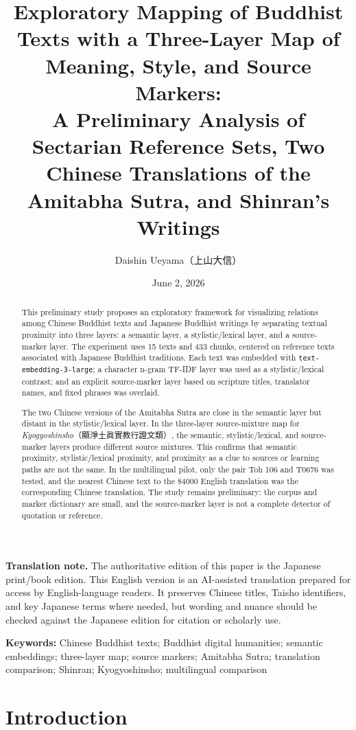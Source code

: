 \documentclass[uplatex,dvipdfmx,11pt,a4paper]{jsarticle}
\title{Exploratory Mapping of Buddhist Texts with a Three-Layer Map of Meaning, Style, and Source Markers:\\[0.35em]A Preliminary Analysis of Sectarian Reference Sets, Two Chinese Translations of the Amitabha Sutra, and Shinran's Writings}
\author{Daishin Ueyama（上山大信）}
\date{June 2, 2026}
\begin{document}
\maketitle

\noindent\textbf{Translation note.}
The authoritative edition of this paper is the Japanese print/book edition. This English version is an AI-assisted translation prepared for access by English-language readers. It preserves Chinese titles, Taisho identifiers, and key Japanese terms where needed, but wording and nuance should be checked against the Japanese edition for citation or scholarly use.

\begin{abstract}
This preliminary study proposes an exploratory framework for visualizing relations among Chinese Buddhist texts and Japanese Buddhist writings by separating textual proximity into three layers: a semantic layer, a stylistic/lexical layer, and a source-marker layer. The experiment uses 15 texts and 433 chunks, centered on reference texts associated with Japanese Buddhist traditions. Each text was embedded with \texttt{text-embedding-3-large}; a character n-gram TF-IDF layer was used as a stylistic/lexical contrast; and an explicit source-marker layer based on scripture titles, translator names, and fixed phrases was overlaid.

The two Chinese versions of the Amitabha Sutra are close in the semantic layer but distant in the stylistic/lexical layer. In the three-layer source-mixture map for \textit{Kyogyoshinsho}（顯淨土眞實教行證文類）, the semantic, stylistic/lexical, and source-marker layers produce different source mixtures. This confirms that semantic proximity, stylistic/lexical proximity, and proximity as a clue to sources or learning paths are not the same. In the multilingual pilot, only the pair Toh 106 and T0676 was tested, and the nearest Chinese text to the 84000 English translation was the corresponding Chinese translation. The study remains preliminary: the corpus and marker dictionary are small, and the source-marker layer is not a complete detector of quotation or reference.
\end{abstract}

\noindent\textbf{Keywords:} Chinese Buddhist texts; Buddhist digital humanities; semantic embeddings; three-layer map; source markers; Amitabha Sutra; translation comparison; Shinran; Kyogyoshinsho; multilingual comparison

\section{Introduction}
\end{document}
